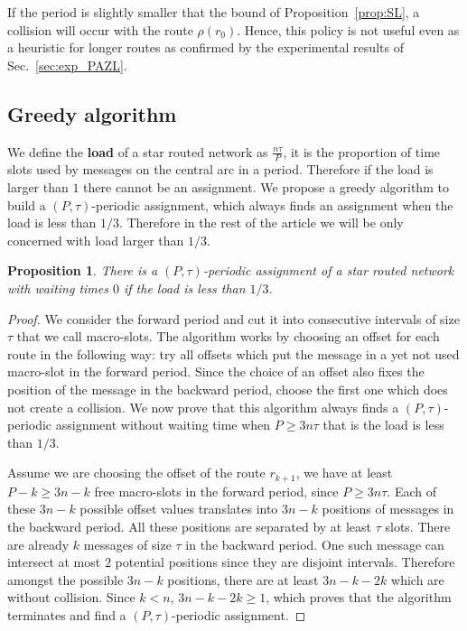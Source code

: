 \documentclass[10pt, conference, letterpaper]{IEEEtran}
\newtheorem{proposition}{Proposition}
\begin{document}
      If the period is slightly smaller that the bound of Proposition~\ref{prop:SL}, a collision will occur with the route $\rho(r_0)$. Hence, this policy is not useful even as a heuristic for longer routes as confirmed by the experimental results of Sec.~\ref{sec:exp_PAZL}. 

   
    \subsection{Greedy algorithm}
    
    
      We define the \textbf{load} of a star routed network as $\frac{n\tau}{P}$, it is the proportion of time slots used by messages on the central arc in a period. Therefore if the load is larger than $1$ there cannot be an assignment. We propose a greedy algorithm to build a $(P,\tau)$-periodic assignment, which always finds an assignment when the load is less than $1/3$. Therefore in the rest of the article we will be only concerned with load larger than $1/3$.
    
    \begin{proposition}
    There is a $(P,\tau)$-periodic assignment of a star routed network with waiting times $0$ if the load is less than $1/3$.
    \end{proposition}
    \begin{proof}
     We consider the forward period and cut it into consecutive intervals of size $\tau$ that we call macro-slots. The algorithm works by choosing an offset for each route in the following way: try all offsets which put the message in a yet not used macro-slot in the forward
     period. Since the choice of an offset also fixes the position of the message in the backward period, choose the first one which does not create a collision. We now prove that this algorithm always finds a $(P,\tau)$-periodic assignment without waiting time when $P \geq 3n\tau$ that is the load is less than $1/3$.
     
     Assume we are choosing the offset of the route $r_{k+1}$, we have at least $P - k \geq 3n - k$ free macro-slots in the forward period, since $P \geq 3n\tau$. Each of these $3n - k$ possible offset values translates into $3n - k$ positions of messages in the backward period. All these positions are separated by at least $\tau$ slots. There are already $k$ messages of size $\tau$ in the backward period. One such message can intersect at most $2$ potential positions since they are disjoint intervals. Therefore  amongst the possible $3n - k$ positions, there are  at least $3n - k -2k$ which are without collision. Since $k < n$, $3n - k -2k \geq 1$, which proves that the algorithm terminates and find a  $(P,\tau)$-periodic assignment. 
%      
     \end{proof}
     
\end{document}
